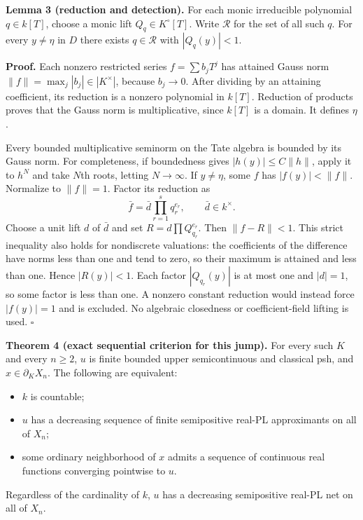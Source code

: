 \documentclass[
  11pt,
]{article}
\providecommand{\tightlist}{%
  \setlength{\itemsep}{0pt}\setlength{\parskip}{0pt}}
\begin{document}
\textbf{Lemma 3 (reduction and detection).} For each monic irreducible
polynomial \(q\in k[T]\), choose a monic lift \(Q_q\in K^\circ[T]\).
Write \(\mathcal R\) for the set of all such \(q\). For every
\(y\ne\eta\) in \(D\) there exists \(q\in\mathcal R\) with
\(|Q_q(y)|<1\).

\textbf{Proof.} Each nonzero restricted series \(f=\sum b_jT^j\) has
attained Gauss norm \(\|f\|=\max_j|b_j|\in|K^\times|\), because
\(b_j\to0\). After dividing by an attaining coefficient, its reduction
is a nonzero polynomial in \(k[T]\). Reduction of products proves that
the Gauss norm is multiplicative, since \(k[T]\) is a domain. It defines
\(\eta\).

Every bounded multiplicative seminorm on the Tate algebra is bounded by
its Gauss norm. For completeness, if boundedness gives
\(|h(y)|\le C\|h\|\), apply it to \(h^N\) and take \(N\)th roots,
letting \(N\to\infty\). If \(y\ne\eta\), some \(f\) has
\(|f(y)|<\|f\|\). Normalize to \(\|f\|=1\). Factor its reduction as
\[\bar f=\bar d\prod_{r=1}^s q_r^{e_r},\qquad \bar d\in k^\times.\]
Choose a unit lift \(d\) of \(\bar d\) and set
\(R=d\prod Q_{q_r}^{e_r}\). Then \(\|f-R\|<1\). This strict inequality
also holds for nondiscrete valuations: the coefficients of the
difference have norms less than one and tend to zero, so their maximum
is attained and less than one. Hence \(|R(y)|<1\). Each factor
\(|Q_{q_r}(y)|\) is at most one and \(|d|=1\), so some factor is less
than one. A nonzero constant reduction would instead force \(|f(y)|=1\)
and is excluded. No algebraic closedness or coefficient-field lifting is
used. \(\square\)

\textbf{Theorem 4 (exact sequential criterion for this jump).} For every
such \(K\) and every \(n\ge2\), \(u\) is finite bounded upper
semicontinuous and classical psh, and \(x\in\partial_KX_n\). The
following are equivalent:

\begin{itemize}
\tightlist
\item
  \(k\) is countable;
\item
  \(u\) has a decreasing sequence of finite semipositive real-PL
  approximants on all of \(X_n\);
\item
  some ordinary neighborhood of \(x\) admits a sequence of continuous
  real functions converging pointwise to \(u\).
\end{itemize}

Regardless of the cardinality of \(k\), \(u\) has a decreasing
semipositive real-PL net on all of \(X_n\).
\end{document}
